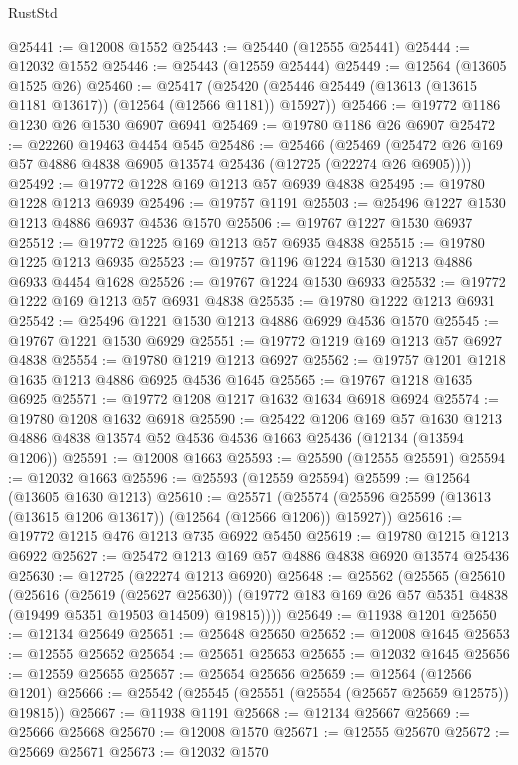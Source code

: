 \begin{lexlean}{RustStd}
\begin{coremodule}
{\begin{coremodule}
{{{{{{{{{{{{{{{{{{{{{{{{{{{{{{{{{{{{{{{{{{{{{{{{{{{{{{{{{{{{{{{{{{{{{{{{{{{{{{{{@25441 := @12008 @1552
@25443 := @25440 (@12555 @25441)
@25444 := @12032 @1552
@25446 := @25443 (@12559 @25444)
@25449 := @12564 (@13605 @1525 @26)
@25460 := @25417
    (@25420 (@25446 @25449 (@13613 (@13615 @1181 @13617)) (@12564 (@12566 @1181)) @15927))
@25466 := @19772 @1186 @1230 @26 @1530 @6907 @6941
@25469 := @19780 @1186 @26 @6907
@25472 := @22260 @19463 @4454 @545
@25486 := @25466
    (@25469 (@25472 @26 @169 @57 @4886 @4838 @6905 @13574 @25436 (@12725 (@22274 @26 @6905))))
@25492 := @19772 @1228 @169 @1213 @57 @6939 @4838
@25495 := @19780 @1228 @1213 @6939
@25496 := @19757 @1191
@25503 := @25496 @1227 @1530 @1213 @4886 @6937 @4536 @1570
@25506 := @19767 @1227 @1530 @6937
@25512 := @19772 @1225 @169 @1213 @57 @6935 @4838
@25515 := @19780 @1225 @1213 @6935
@25523 := @19757 @1196 @1224 @1530 @1213 @4886 @6933 @4454 @1628
@25526 := @19767 @1224 @1530 @6933
@25532 := @19772 @1222 @169 @1213 @57 @6931 @4838
@25535 := @19780 @1222 @1213 @6931
@25542 := @25496 @1221 @1530 @1213 @4886 @6929 @4536 @1570
@25545 := @19767 @1221 @1530 @6929
@25551 := @19772 @1219 @169 @1213 @57 @6927 @4838
@25554 := @19780 @1219 @1213 @6927
@25562 := @19757 @1201 @1218 @1635 @1213 @4886 @6925 @4536 @1645
@25565 := @19767 @1218 @1635 @6925
@25571 := @19772 @1208 @1217 @1632 @1634 @6918 @6924
@25574 := @19780 @1208 @1632 @6918
@25590 := @25422
    @1206
    @169
    @57
    @1630
    @1213
    @4886
    @4838
    @13574
    @52
    @4536
    @4536
    @1663
    @25436
    (@12134 (@13594 @1206))
@25591 := @12008 @1663
@25593 := @25590 (@12555 @25591)
@25594 := @12032 @1663
@25596 := @25593 (@12559 @25594)
@25599 := @12564 (@13605 @1630 @1213)
@25610 := @25571
    (@25574 (@25596 @25599 (@13613 (@13615 @1206 @13617)) (@12564 (@12566 @1206)) @15927))
@25616 := @19772 @1215 @476 @1213 @735 @6922 @5450
@25619 := @19780 @1215 @1213 @6922
@25627 := @25472 @1213 @169 @57 @4886 @4838 @6920 @13574 @25436
@25630 := @12725 (@22274 @1213 @6920)
@25648 := @25562
    (@25565
      (@25610
        (@25616
          (@25619 (@25627 @25630))
          (@19772 @183 @169 @26 @57 @5351 @4838 (@19499 @5351 @19503 @14509) @19815))))
@25649 := @11938 @1201
@25650 := @12134 @25649
@25651 := @25648 @25650
@25652 := @12008 @1645
@25653 := @12555 @25652
@25654 := @25651 @25653
@25655 := @12032 @1645
@25656 := @12559 @25655
@25657 := @25654 @25656
@25659 := @12564 (@12566 @1201)
@25666 := @25542 (@25545 (@25551 (@25554 (@25657 @25659 @12575)) @19815))
@25667 := @11938 @1191
@25668 := @12134 @25667
@25669 := @25666 @25668
@25670 := @12008 @1570
@25671 := @12555 @25670
@25672 := @25669 @25671
@25673 := @12032 @1570
}}}}}}}}}}}}}}}}}}}}}}}}}}}}}}}}}}}}}}}}}}}}}}}}}}}}}}}}}}}}}}}}}}}}}}}}}}}}}}}}
\end{coremodule}}
\end{coremodule}
\end{lexlean}
